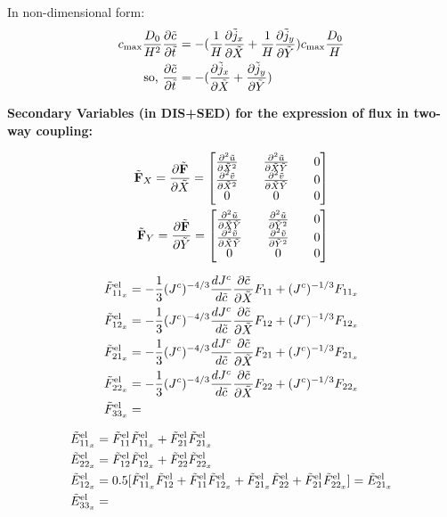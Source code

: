 \documentclass[../main.tex]{subfiles}
\begin{document}
In non-dimensional form:
\begin{align}
    \cmax \fc{D_0}{H^2} \pdiff{{\td{c}}}{\tt}  &= -(\fc{1}{H}\pdiff{ \td{j}_x}{\tX} + \fc{1}{H}\pdiff{ \td{j}_y}{\tY})\cmax \fc{D_0}{H} \\
    \text{so, }  \pdiff{{\tc}}{\tt}  &= - (\pdiff{ \td{j}_x}{\tX} +  \pdiff{ \td{j}_y}{\tY})
\end{align}

\textbf{Secondary Variables (in DIS+SED) for the expression of flux in two-way coupling:}

\begin{align}
\td{\F}_X = \pdiff{ \td \F}{\tX} = 
\begin{bmatrix}
     \pdiff{ ^2 \td u}{\tX^2} && \pdiff{ ^2 \td u}{\tX \tY} && 0 \\
     \pdiff{ ^2 \td v}{ \tX^2} &&  \pdiff{ ^2 \td v}{ \tX \tY} && 0 \\
    0 && 0 && 0
\end{bmatrix}\\
\td{\F}_Y = \pdiff{ \td \F}{ \tY} = 
\begin{bmatrix}
    \pdiff{ ^2 \td u}{ \tX  \tY} && \pdiff{ ^2 \td u}{ \tY^2} && 0  \\
     \pdiff{ ^2 \td v}{ \tX   \tY} && \pdiff{ ^2 \td v}{  \tY^2} && 0 \\
    0 && 0 && 0
\end{bmatrix}
\end{align}

\begin{align}
    \tFel{11_x} &= -\fc{1}{3}(\jc)^{-4/3} \djc \tcx  F_{11} + (\jc)^{-1/3}F_{11_x} \\
    \tFel{12_x} &= -\fc{1}{3}(\jc)^{-4/3} \djc \tcx  F_{12} + (\jc)^{-1/3}F_{12_x}\\ 
    \tFel{21_x} &= -\fc{1}{3}(\jc)^{-4/3} \djc \tcx  F_{21} + (\jc)^{-1/3}F_{21_x}\\
    \tFel{22_x} &= -\fc{1}{3}(\jc)^{-4/3} \djc \tcx  F_{22} + (\jc)^{-1/3}F_{22_x}\\
    \tFel{33_x} &=
\end{align}

\begin{align}
    \tEel{11_x} &= \tFel{11} \tFel{11_x} + \tFel{21} \tFel{21_x} \\
    \tEel{22_x} &= \tFel{12} \tFel{12_x} + \tFel{22} \tFel{22_x} \\
    \tEel{12_x} &= 0.5[\tFel{11_x}\tFel{12} + \tFel{11}\tFel{12_x}  + \tFel{21_x}\tFel{22} + \tFel{21}\tFel{22_x}] = \tEel{21_x}\\
    \tEel{33_x} &= 
\end{align}
\end{document}

